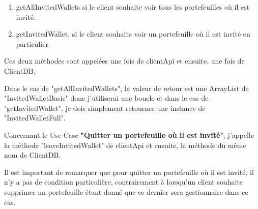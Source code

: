 \begin{enumerate}
\item getAllInvitedWallets si le client souhaite voir tous les portefeuilles où il est invité.
\item getInvitedWallet, si le client souhaite voir un portefeuille où il est invité en particulier.
\end{enumerate}

\begin{flushleft}
Ces deux méthodes sont appelées une fois de clientApi et ensuite, une fois de ClientDB.
\end{flushleft}

\begin{flushleft}
Dans le cas de "getAllInvitedWallets", la valeur de retour est une ArrayList de "InvitedWalletBasic" donc j'utiliserai une boucle et dans le cas de "getInvitedWallet", je dois simplement retourner une instance de "InvitedWalletFull".
\end{flushleft}

\begin{flushleft}
Concernant le Use Case \textbf{"Quitter un portefeuille où il est invité"}, j'appelle la méthode "leaveInvitedWallet" de clientApi et ensuite, la méthode du même nom de ClientDB.
\end{flushleft}

\begin{flushleft}
Il est important de remarquer que pour quitter un portefeuille où il est invité, il n'y a pas de condition particulière, contrairement à lorsqu'un client souhaite supprimer un portefeuille étant donné que ce dernier sera gestionnaire dans ce cas.
\end{flushleft}


